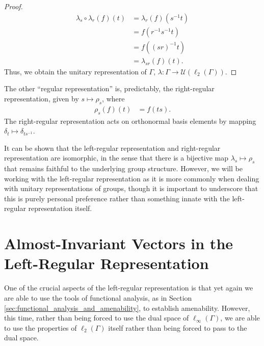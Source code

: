 \begin{proof}
\begin{align*}
    \lambda_{s}\circ \lambda_r\left( f \right)\left( t \right) &= \lambda_{r}\left( f \right)\left( s^{-1}t \right)\\
                                                               &= f\left( r^{-1}s^{-1}t \right)\\
                                                               &= f\left( \left( sr \right)^{-1}t \right)\\
                                                               &= \lambda_{sr}\left( f \right)\left( t \right).
  \end{align*}
  Thus, we obtain the unitary representation of $\Gamma$, $\lambda\colon\Gamma\rightarrow \mathcal{U}\left( \ell_2\left( \Gamma \right) \right)$.
\end{proof}
\begin{remark}
  The other ``regular representation'' is, predictably, the right-regular representation, given by $s \mapsto \rho_s$, where
  \begin{align*}
    \rho_s\left( f \right)\left( t \right) &= f\left( ts \right).
  \end{align*}
  The right-regular representation acts on orthonormal basis elements by mapping $\delta_t \mapsto \delta_{ts^{-1}}$.\newline

  It can be shown that the left-regular representation and right-regular representation are isomorphic, in the sense that there is a bijective map $\lambda_s\mapsto \rho_s$ that remains faithful to the underlying group structure. However, we will be working with the left-regular representation as it is more commonly when dealing with unitary representations of groups, though it is important to underscore that this is purely personal preference rather than something innate with the left-regular representation itself.
\end{remark}
\section{Almost-Invariant Vectors in the Left-Regular Representation}%
One of the crucial aspects of the left-regular representation is that yet again we are able to use the tools of functional analysis, as in Section \ref{sec:functional_analysis_and_amenability}, to establish amenability. However, this time, rather than being forced to use the dual space of $\ell_{\infty}\left(\Gamma\right)$, we are able to use the properties of $\ell_2\left( \Gamma \right)$ itself rather than being forced to pass to the dual space.\newline

